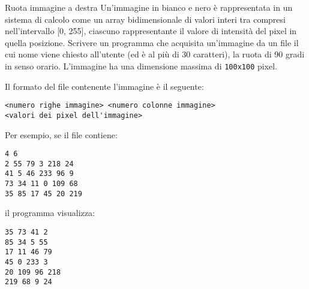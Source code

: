 \begin{labex}{Ruota immagine a destra}
Un'immagine in bianco e nero \`e rappresentata in un sistema di calcolo come un array bidimensionale di valori interi tra compresi nell'intervallo [0, 255],  ciascuno rappresentante il valore di intensit\`a del pixel in quella posizione. 
Scrivere un programma che acquisita un'immagine da un file il cui nome viene chiesto all'utente (ed \`e al pi\`u di 30 caratteri), la ruota di 90 gradi in senso orario.
L'immagine ha una dimensione massima di \texttt{100x100} pixel.

Il formato del file contenente l'immagine \`e il seguente:
\begin{verbatim}
<numero righe immagine> <numero colonne immagine>
<valori dei pixel dell'immagine>
\end{verbatim}

Per esempio, se il file contiene:
\begin{verbatim}
4 6
2 55 79 3 218 24
41 5 46 233 96 9
73 34 11 0 109 68
35 85 17 45 20 219
\end{verbatim}
il programma visualizza:
\begin{verbatim}
35 73 41 2
85 34 5 55
17 11 46 79
45 0 233 3
20 109 96 218
219 68 9 24
\end{verbatim}


\begin{labexinout}
\end{labexinout}



\end{labex}



